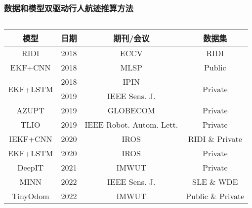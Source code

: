 \begin{frame}
	\frametitle{数据和模型双驱动行人航迹推算方法}
	\begin{columns}[t]
		\begin{column}{0.5\textwidth}
		{
		    \tiny
		    \setlength{\tabcolsep}{2pt}
			\begin{tabular*}{\linewidth}{@{\extracolsep{\fill}}cccc}
				\toprule
				\multicolumn{1}{c}{模型} & 日期 & 期刊/会议 & 数据集 \\
				\midrule
				                     RIDI & 2018 & ECCV                            & RIDI                     \\ %
				                  EKF+CNN & 2018 & MLSP                            & Public                     \\ %
				\multirow{2}{*}{EKF+LSTM} & 2018 & IPIN                            & \multirow{2}{*}{Private} \\ %
				                          & 2019 & IEEE Sens. J.                   &                          \\ %
				                    AZUPT & 2019 & GLOBECOM                        & Private                  \\ %
				                     TLIO & 2019 & IEEE Robot. Autom. Lett.        & Private                  \\ %
				                 IEKF+CNN & 2020 & IROS                            & RIDI \& Private          \\ %
				                 EKF+LSTM & 2020 & IROS                            & Private                  \\ %
				                   DeepIT & 2021 & IMWUT                           & Private                  \\ %
				                     MINN & 2022 & IEEE Sens. J.                   & SLE \& WDE         \\ %
				                 TinyOdom & 2022 & IMWUT                           & Public \& Private         \\ %

\end{tabular*}}
\end{column}
\end{columns}
\end{frame}
